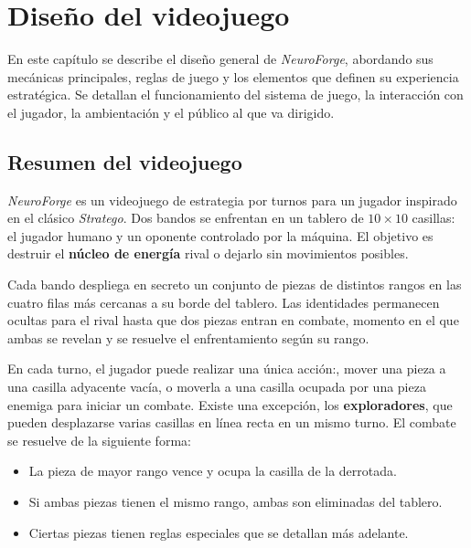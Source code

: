 \chapter{Diseño del videojuego}

En este capítulo se describe el diseño general de \textit{NeuroForge}, abordando sus mecánicas principales, reglas de juego y los elementos que definen su experiencia estratégica. Se detallan el funcionamiento del sistema de juego, la interacción con el jugador, la ambientación y el público al que va dirigido.

\section{Resumen del videojuego}

\textit{NeuroForge} es un videojuego de estrategia por turnos para un jugador inspirado en el clásico \textit{Stratego}. Dos bandos se enfrentan en un tablero de $10 \times 10$ casillas: el jugador humano y un oponente controlado por la máquina. El objetivo es destruir el \textbf{núcleo de energía} rival o dejarlo sin movimientos posibles.

Cada bando despliega en secreto un conjunto de piezas de distintos rangos en las cuatro filas más cercanas a su borde del tablero. Las identidades permanecen ocultas para el rival hasta que dos piezas entran en combate, momento en el que ambas se revelan y se resuelve el enfrentamiento según su rango.

En cada turno, el jugador puede realizar una única acción:, mover una pieza a una casilla adyacente vacía, o moverla a una casilla ocupada por una pieza enemiga para iniciar un combate. Existe una excepción, los \textbf{exploradores}, que pueden desplazarse varias casillas en línea recta en un mismo turno. El combate se resuelve de la siguiente forma:

\begin{itemize}
	\item La pieza de mayor rango vence y ocupa la casilla de la derrotada.
	\item Si ambas piezas tienen el mismo rango, ambas son eliminadas del tablero.
	\item Ciertas piezas tienen reglas especiales que se detallan más adelante.
\end{itemize}


